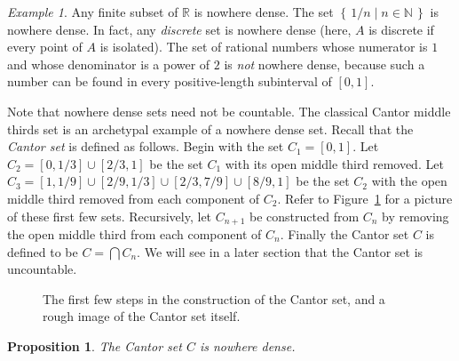 \documentclass[11pt,oneside]{amsbook}
\newcommand{\set}[1]{\left\{\,#1\,\right\}}
\newcommand{\N}{\mathbb N}
\newcommand{\R}{\mathbb R}
\theoremstyle{definition}
\theoremstyle{plain}
\newtheorem{proposition}[theorem]{Proposition}
\theoremstyle{definition}
\theoremstyle{remark}
\newtheorem{example}[theorem]{Example}
\numberwithin{equation}{section}
\numberwithin{figure}{section}
\begin{document}
\begin{example}
  Any finite subset of $\R$ is nowhere dense. The set $\set{1/n\mid n\in\N}$ is nowhere dense. In fact, any \emph{discrete} set is nowhere dense (here, $A$ is discrete if every point of $A$ is isolated). The set of rational numbers whose numerator is $1$ and whose denominator is a power of $2$ is \emph{not} nowhere dense, because such a number can be found in every positive-length subinterval of $[0,1]$.
\end{example}

Note that nowhere dense sets need not be countable. The classical Cantor middle thirds set is an archetypal example of a nowhere dense set. Recall that the \emph{Cantor set} is defined as follows. Begin with the set $C_1=[0,1]$. Let $C_2=[0,1/3]\cup[2/3,1]$ be the set $C_1$ with its open middle third removed. Let $C_3=[1,1/9]\cup[2/9,1/3]\cup[2/3,7/9]\cup[8/9,1]$ be the set $C_2$ with the open middle third removed from each component of $C_2$. Refer to Figure~\ref{fig:cantor-set} for a picture of these first few sets. Recursively, let $C_{n+1}$ be constructed from $C_n$ by removing the open middle third from each component of $C_n$. Finally the Cantor set $C$ is defined to be $C=\bigcap C_n$. We will see in a later section that the Cantor set is uncountable. %

\begin{figure}[h]
\begin{center}
\end{center}
\caption{The first few steps in the construction of the Cantor set, and a rough image of the Cantor set itself.\label{fig:cantor-set}}
\end{figure}

\begin{proposition}
  The Cantor set $C$ is nowhere dense.
\end{proposition}
\end{document}
